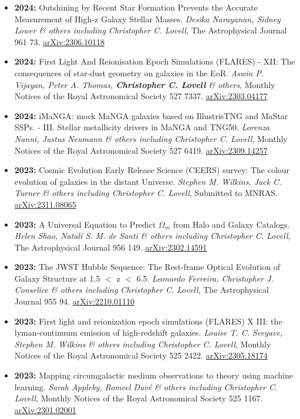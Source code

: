 \begin{itemize}
\item \textbf{2024:} Outshining by Recent Star Formation Prevents the Accurate Measurement of High-z Galaxy Stellar Masses. \textit{Desika Narayanan, Sidney Lower \& others including Christopher C. Lovell}, The Astrophysical Journal 961 73. \href{https://arxiv.org/abs/2306.10118}{arXiv:2306.10118}
\item \textbf{2024:} First Light And Reionisation Epoch Simulations (FLARES) - XII: The consequences of star-dust geometry on galaxies in the EoR. \textit{Aswin P. Vijayan, Peter A. Thomas, \textbf{Christopher C. Lovell} \& others}, Monthly Notices of the Royal Astronomical Society 527 7337. \href{https://arxiv.org/abs/2303.04177}{arXiv:2303.04177}
\item \textbf{2024:} iMaNGA: mock MaNGA galaxies based on IllustrisTNG and MaStar SSPs. - III. Stellar metallicity drivers in MaNGA and TNG50. \textit{Lorenza Nanni, Justus Neumann \& others including Christopher C. Lovell}, Monthly Notices of the Royal Astronomical Society 527 6419. \href{https://arxiv.org/abs/2309.14257}{arXiv:2309.14257}
\item \textbf{2023:} Cosmic Evolution Early Release Science (CEERS) survey: The colour evolution of galaxies in the distant Universe. \textit{Stephen M. Wilkins, Jack C. Turner \& others including Christopher C. Lovell}, Submitted to MNRAS. \href{https://arxiv.org/abs/2311.08065}{arXiv:2311.08065}
\item \textbf{2023:} A Universal Equation to Predict $\Omega_{m}$ from Halo and Galaxy Catalogs. \textit{Helen Shao, Natalí S. M. de Santi \& others including Christopher C. Lovell}, The Astrophysical Journal 956 149. \href{https://arxiv.org/abs/2302.14591}{arXiv:2302.14591}
\item \textbf{2023:} The JWST Hubble Sequence: The Rest-frame Optical Evolution of Galaxy Structure at 1.5 $<$ z $<$ 6.5. \textit{Leonardo Ferreira, Christopher J. Conselice \& others including Christopher C. Lovell}, The Astrophysical Journal 955 94. \href{https://arxiv.org/abs/2210.01110}{arXiv:2210.01110}
\item \textbf{2023:} First light and reionization epoch simulations (FLARES) X III: the lyman-continuum emission of high-redshift galaxies. \textit{Louise T. C. Seeyave, Stephen M. Wilkins \& others including Christopher C. Lovell}, Monthly Notices of the Royal Astronomical Society 525 2422. \href{https://arxiv.org/abs/2305.18174}{arXiv:2305.18174}
\item \textbf{2023:} Mapping circumgalactic medium observations to theory using machine learning. \textit{Sarah Appleby, Romeel Davé \& others including Christopher C. Lovell}, Monthly Notices of the Royal Astronomical Society 525 1167. \href{https://arxiv.org/abs/2301.02001}{arXiv:2301.02001}

\end{itemize}
